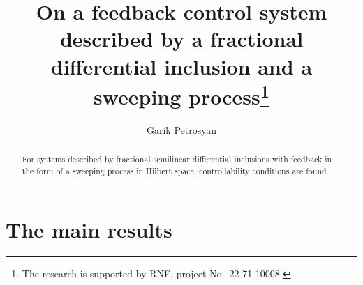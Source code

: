 \documentclass[12pt]{llncs}
\begin{document}
\fi

\title{On a feedback control system described by a fractional differential inclusion and a sweeping process\thanks{The research is supported by RNF, project No.~22-71-10008.}}

\author{Garik Petrosyan 
 }

\maketitle

\begin{abstract}
For systems described by fractional semilinear differential inclusions with feedback in the form of a sweeping process in Hilbert space, controllability conditions are found.

\end{abstract}


\section{The main results} %
\end{document}
